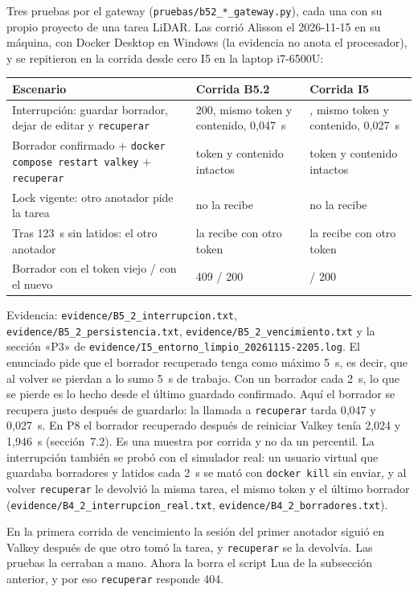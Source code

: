 \documentclass[10pt,letterpaper]{article}
\newcommand{\ev}[1]{{\footnotesize\texttt{evidence/\allowbreak #1}}}
\begin{document}
Tres pruebas por el gateway (\texttt{pruebas/b52\_*\_gateway.py}), cada una con su propio proyecto de una
tarea LiDAR. Las corrió Alisson el 2026-11-15 en su máquina, con Docker Desktop en Windows (la evidencia no
anota el procesador), y se repitieron en la corrida desde cero I5 en la laptop i7-6500U:

\begin{center}\footnotesize
\begin{tabular}{@{}>{\raggedright}p{}>{\raggedright}p{}>{\raggedright\arraybackslash}p{}@{}}
\toprule
Escenario & Corrida B5.2 & Corrida I5 \\
\midrule
Interrupción: guardar borrador, dejar de editar y \texttt{recuperar} & 200, mismo token y contenido, 0,047~s & 200, mismo token y contenido, 0,027~s \\
Borrador confirmado + \texttt{docker compose restart valkey} + \texttt{recuperar} & token y contenido intactos & token y contenido intactos \\
Lock vigente: otro anotador pide la tarea & no la recibe & no la recibe \\
Tras 123~s sin latidos: el otro anotador & la recibe con otro token & la recibe con otro token \\
Borrador con el token viejo / con el nuevo & 409 / 200 & 409 / 200 \\
\bottomrule
\end{tabular}
\end{center}

Evidencia: \ev{B5\_2\_interrupcion.txt}, \ev{B5\_2\_persistencia.txt}, \ev{B5\_2\_vencimiento.txt} y la
sección «P3» de \ev{I5\_entorno\_limpio\_20261115-2205.log}. El enunciado pide que el borrador
recuperado tenga como máximo 5~s, es decir, que al volver se pierdan a lo sumo 5~s de trabajo. Con un
borrador cada 2~s, lo que se pierde es lo hecho desde el último guardado confirmado. Aquí el borrador se
recupera justo después de guardarlo: la llamada a \texttt{recuperar} tarda 0,047 y 0,027~s. En P8 el
borrador recuperado después de reiniciar Valkey tenía 2,024 y 1,946~s (sección~7.2). Es una muestra por
corrida y no da un percentil. La interrupción también se probó con el simulador real: un usuario virtual que
guardaba borradores y latidos cada 2~s se mató con \texttt{docker kill} sin enviar, y al volver
\texttt{recuperar} le devolvió la misma tarea, el mismo token y el último borrador
(\ev{B4\_2\_interrupcion\_real.txt}, \ev{B4\_2\_borradores.txt}).

En la primera corrida de vencimiento la sesión del primer anotador siguió en Valkey después de que otro tomó
la tarea, y \texttt{recuperar} se la devolvía. Las pruebas la cerraban a mano. Ahora la borra el script Lua de la
subsección anterior, y por eso \texttt{recuperar} responde 404.
\end{document}
